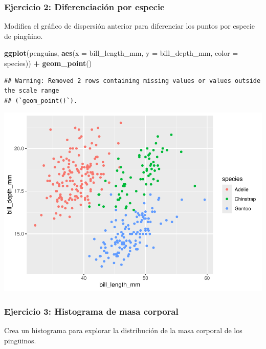 \documentclass[
]{book}
\newenvironment{Shaded}{\begin{snugshade}}{\end{snugshade}}
\newcommand{\AttributeTok}[1]{\textcolor[rgb]{0.13,0.29,0.53}{#1}}
\newcommand{\FunctionTok}[1]{\textcolor[rgb]{0.13,0.29,0.53}{\textbf{#1}}}
\newcommand{\NormalTok}[1]{#1}
\newcommand{\SpecialCharTok}[1]{\textcolor[rgb]{0.81,0.36,0.00}{\textbf{#1}}}
\begin{document}
\subsubsection{Ejercicio 2: Diferenciación por especie}\label{ejercicio-2-diferenciaciuxf3n-por-especie}

Modifica el gráfico de dispersión anterior para diferenciar los puntos por especie de pingüino.

\begin{Shaded}
\begin{Highlighting}[]
\FunctionTok{ggplot}\NormalTok{(penguins, }\FunctionTok{aes}\NormalTok{(}\AttributeTok{x =}\NormalTok{ bill\_length\_mm, }\AttributeTok{y =}\NormalTok{ bill\_depth\_mm, }\AttributeTok{color =}\NormalTok{ species)) }\SpecialCharTok{+}
  \FunctionTok{geom\_point}\NormalTok{()}
\end{Highlighting}
\end{Shaded}

\begin{verbatim}
## Warning: Removed 2 rows containing missing values or values outside the scale range
## (`geom_point()`).
\end{verbatim}

\includegraphics{bookdown-demo_files/figure-latex/unnamed-chunk-184-1.pdf}

\subsubsection{Ejercicio 3: Histograma de masa corporal}\label{ejercicio-3-histograma-de-masa-corporal}

Crea un histograma para explorar la distribución de la masa corporal de los pingüinos.
\end{document}
